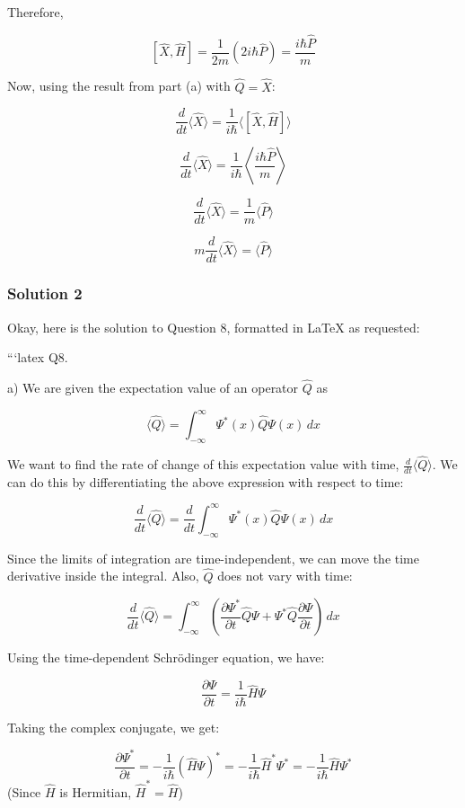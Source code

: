 \documentclass{article}
\begin{document}
Therefore,

\[
[\hat{X}, \hat{H}] = \frac{1}{2m} (2i\hbar \hat{P}) = \frac{i\hbar \hat{P}}{m}
\]

Now, using the result from part (a) with $\hat{Q} = \hat{X}$:

\[
\frac{d}{dt} \langle \hat{X} \rangle = \frac{1}{i\hbar} \langle [\hat{X}, \hat{H}] \rangle
\]

\[
\frac{d}{dt} \langle \hat{X} \rangle = \frac{1}{i\hbar} \left\langle \frac{i\hbar \hat{P}}{m} \right\rangle
\]

\[
\frac{d}{dt} \langle \hat{X} \rangle = \frac{1}{m} \langle \hat{P} \rangle
\]

\[
m \frac{d}{dt} \langle \hat{X} \rangle = \langle \hat{P} \rangle
\]

\subsubsection{Solution 2}
Okay, here is the solution to Question 8, formatted in LaTeX as requested:

```latex
\noindent Q8.

\noindent a) We are given the expectation value of an operator $\hat{Q}$ as

\[
\langle \hat{Q} \rangle = \int_{-\infty}^{\infty} \Psi^*(x) \hat{Q} \Psi(x) \, dx
\]

\noindent We want to find the rate of change of this expectation value with time, $\frac{d}{dt} \langle \hat{Q} \rangle$. We can do this by differentiating the above expression with respect to time:

\[
\frac{d}{dt} \langle \hat{Q} \rangle = \frac{d}{dt} \int_{-\infty}^{\infty} \Psi^*(x) \hat{Q} \Psi(x) \, dx
\]

\noindent Since the limits of integration are time-independent, we can move the time derivative inside the integral. Also, $\hat{Q}$ does not vary with time:

\[
\frac{d}{dt} \langle \hat{Q} \rangle = \int_{-\infty}^{\infty} \left( \frac{\partial \Psi^*}{\partial t} \hat{Q} \Psi + \Psi^* \hat{Q} \frac{\partial \Psi}{\partial t} \right) \, dx
\]

\noindent Using the time-dependent Schrödinger equation, we have:

\[
\frac{\partial \Psi}{\partial t} = \frac{1}{i\hbar} \hat{H} \Psi
\]

\noindent Taking the complex conjugate, we get:

\[
\frac{\partial \Psi^*}{\partial t} = -\frac{1}{i\hbar} (\hat{H} \Psi)^* = -\frac{1}{i\hbar} \hat{H}^* \Psi^* = -\frac{1}{i\hbar} \hat{H} \Psi^*
\]
\noindent (Since $\hat{H}$ is Hermitian, $\hat{H}^* = \hat{H}$)
\end{document}
